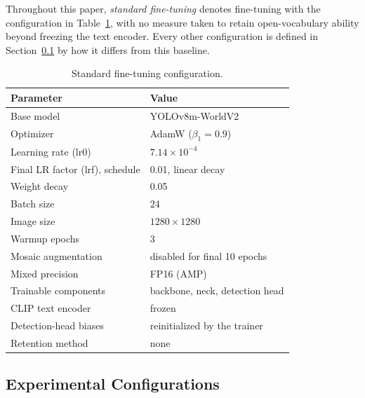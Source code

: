 \documentclass[conf]{new-aiaa}
\begin{document}
Throughout this paper, \emph{standard fine-tuning} denotes fine-tuning with the configuration in
Table~\ref{tab:hyperparams}, with no measure taken to retain open-vocabulary ability beyond
freezing the text encoder. Every other configuration is defined in Section~\ref{sec:configs} by how it
differs from this baseline.

\begin{table}[hbt!]
\caption{Standard fine-tuning configuration.}
\label{tab:hyperparams}
\centering
\begin{tabular}{ll}
\hline
\textbf{Parameter} & \textbf{Value} \\
\hline
Base model                       & YOLOv8m-WorldV2 \\
Optimizer                        & AdamW ($\beta_1 = 0.9$) \\
Learning rate (lr0)              & $7.14 \times 10^{-4}$ \\
Final LR factor (lrf), schedule  & 0.01, linear decay \\
Weight decay                     & 0.05 \\
Batch size                       & 24 \\
Image size                       & $1280 \times 1280$ \\
Warmup epochs                    & 3 \\
Mosaic augmentation              & disabled for final 10 epochs \\
Mixed precision                  & FP16 (AMP) \\
Trainable components             & backbone, neck, detection head \\
CLIP text encoder                & frozen \\
Detection-head biases            & reinitialized by the trainer \\
Retention method                 & none \\
\hline
\end{tabular}
\end{table}

\subsection{Experimental Configurations}
\label{sec:configs}
\end{document}
